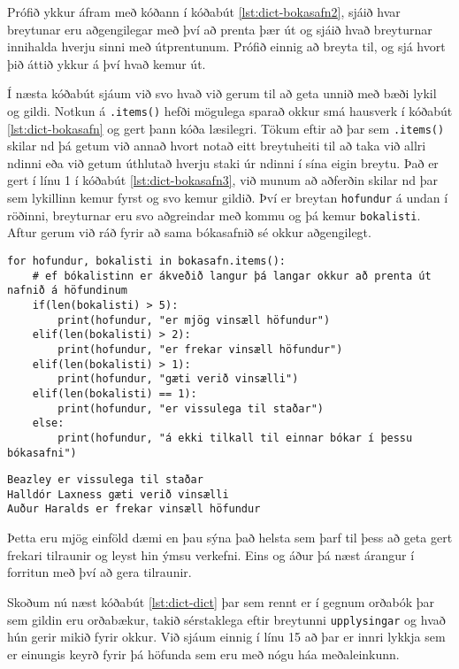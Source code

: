 Prófið ykkur áfram með kóðann í kóðabút \ref{lst:dict-bokasafn2}, sjáið hvar breytunar eru aðgengilegar með því að prenta þær út og sjáið hvað breyturnar innihalda hverju sinni með útprentunum.
Prófið einnig að breyta til, og sjá hvort þið áttið ykkur á því hvað kemur út.

Í næsta kóðabút sjáum við svo hvað við gerum til að geta unnið með bæði lykil og gildi.
Notkun á \texttt{.items()} hefði mögulega sparað okkur smá hausverk í kóðabút \ref{lst:dict-bokasafn} og gert þann kóða læsilegri.
Tökum eftir að þar sem \texttt{.items()} skilar nd þá getum við annað hvort notað eitt breytuheiti til að taka við allri ndinni eða við getum úthlutað hverju staki úr ndinni í sína eigin breytu.
Það er gert í línu 1 í kóðabút \ref{lst:dict-bokasafn3}, við munum að aðferðin skilar nd þar sem lykillinn kemur fyrst og svo kemur gildið.
Því er breytan \texttt{hofundur} á undan í röðinni, breyturnar eru svo aðgreindar með kommu og þá kemur \texttt{bokalisti}.
Aftur gerum við ráð fyrir að sama bókasafnið sé okkur aðgengilegt.

\begin{lstlisting}[caption=Ítrun í gegnum orðabækur með .items(), label=lst:dict-bokasafn3]
for hofundur, bokalisti in bokasafn.items():
	# ef bókalistinn er ákveðið langur þá langar okkur að prenta út nafnið á höfundinum
	if(len(bokalisti) > 5):
		print(hofundur, "er mjög vinsæll höfundur")
	elif(len(bokalisti) > 2):
		print(hofundur, "er frekar vinsæll höfundur")
	elif(len(bokalisti) > 1):
		print(hofundur, "gæti verið vinsælli")
	elif(len(bokalisti) == 1):
		print(hofundur, "er vissulega til staðar")
	else:
		print(hofundur, "á ekki tilkall til einnar bókar í þessu bókasafni")
\end{lstlisting}
\lstset{style=uttak}
\begin{lstlisting}
Beazley er vissulega til staðar
Halldór Laxness gæti verið vinsælli
Auður Haralds er frekar vinsæll höfundur
\end{lstlisting}
\lstset{style=venjulegt}

Þetta eru mjög einföld dæmi en þau sýna það helsta sem þarf til þess að geta gert frekari tilraunir og leyst hin ýmsu verkefni.
Eins og áður þá næst árangur í forritun með því að gera tilraunir.

Skoðum nú næst kóðabút \ref{lst:dict-dict} þar sem rennt er í gegnum orðabók þar sem gildin eru orðabækur, takið sérstaklega eftir breytunni \texttt{upplysingar} og hvað hún gerir mikið fyrir okkur.
Við sjáum einnig í línu 15 að þar er innri lykkja sem er einungis keyrð fyrir þá höfunda sem eru með nógu háa meðaleinkunn.

